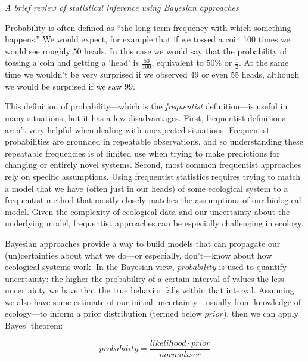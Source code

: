 \documentclass[11pt]{article}
\begin{document}
\emph{A brief review of statistical inference using Bayesian approaches}

Probability is often defined as ``the long-term frequency with which something happens.'' We would expect, for example that if we tossed a coin 100 times we would see roughly 50 heads.  In this case we would say that the probability of tossing a coin and getting a `head' is $\frac{50}{100}$, equivalent to 50\% or $\frac{1}{2}$. At the same time we wouldn’t be very surprised if we observed 49 or even 55 heads, although we would be surprised if we saw 99.

This definition of probability---which is the \emph{frequentist} definition---is useful in many situations, but it has a few disadvantages. First, frequentist definitions aren't very helpful when dealing with unexpected situations. Frequentist probabilities are grounded in repeatable observations, and so understanding these repeatable frequencies is of limited use when trying to make predictions for changing or entirely novel systems. Second, most common frequentist approaches rely on specific assumptions. Using frequentist statistics requires trying to match a model that we have (often just in our heads) of some ecological system to a frequentist method that mostly closely matches the assumptions of our biological model. Given the complexity of ecological data and our uncertainty about the underlying model, frequentist approaches can be especially challenging in ecology. 

Bayesian approaches provide a way to build models that can propagate our (un)certainties about what we do---or especially, don't---know about how ecological systems work. In the Bayesian view, $probability$ is used to quantify uncertainty: the higher the probability of a certain interval of values the less uncertainty we have that the true behavior falls within that interval. Assuming we also have some estimate of our initial uncertainty---usually from knowledge of ecology---to inform a prior distribution (termed below $prior$), then we can apply Bayes’ theorem:

\begin{equation}
  probability = \frac{likelihood \cdot prior}{normaliser}
  \label{bayes_theorem}
\end{equation}
\end{document}
